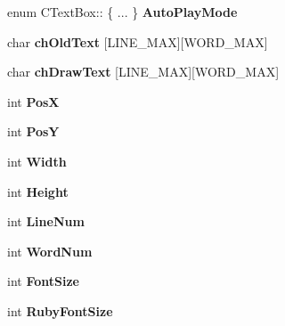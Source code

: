 \begin{DoxyCompactItemize}
\item 
enum C\+Text\+Box\+:: \{ ... \}  {\bfseries Auto\+Play\+Mode}\hypertarget{class_c_text_box_ad30a874114c3e2ca93441e9fb374b61c}{}\label{class_c_text_box_ad30a874114c3e2ca93441e9fb374b61c}

\item 
char {\bfseries ch\+Old\+Text} \mbox{[}L\+I\+N\+E\+\_\+\+M\+AX\mbox{]}\mbox{[}W\+O\+R\+D\+\_\+\+M\+AX\mbox{]}\hypertarget{class_c_text_box_a0454ed50e5d79fefcdc1f91695f2de68}{}\label{class_c_text_box_a0454ed50e5d79fefcdc1f91695f2de68}

\item 
char {\bfseries ch\+Draw\+Text} \mbox{[}L\+I\+N\+E\+\_\+\+M\+AX\mbox{]}\mbox{[}W\+O\+R\+D\+\_\+\+M\+AX\mbox{]}\hypertarget{class_c_text_box_ab018e05077780da9e10d792d4a7ab611}{}\label{class_c_text_box_ab018e05077780da9e10d792d4a7ab611}

\item 
int {\bfseries PosX}\hypertarget{class_c_text_box_a8dcd0af6f70eb5aa8acb77e566031a81}{}\label{class_c_text_box_a8dcd0af6f70eb5aa8acb77e566031a81}

\item 
int {\bfseries PosY}\hypertarget{class_c_text_box_a6889565bd4cb7aa0d89d8883e5f0c320}{}\label{class_c_text_box_a6889565bd4cb7aa0d89d8883e5f0c320}

\item 
int {\bfseries Width}\hypertarget{class_c_text_box_a5efbf7d41c39492fe8db1522d27f426b}{}\label{class_c_text_box_a5efbf7d41c39492fe8db1522d27f426b}

\item 
int {\bfseries Height}\hypertarget{class_c_text_box_a93136077935aeb3f63fc65ced6474d1a}{}\label{class_c_text_box_a93136077935aeb3f63fc65ced6474d1a}

\item 
int {\bfseries Line\+Num}\hypertarget{class_c_text_box_a9556805b6b8b168811701237c1af1d35}{}\label{class_c_text_box_a9556805b6b8b168811701237c1af1d35}

\item 
int {\bfseries Word\+Num}\hypertarget{class_c_text_box_a46cf099d25cac4d9425ac0fea8a298ad}{}\label{class_c_text_box_a46cf099d25cac4d9425ac0fea8a298ad}

\item 
int {\bfseries Font\+Size}\hypertarget{class_c_text_box_afc2123363432553fb08d58dd889cc375}{}\label{class_c_text_box_afc2123363432553fb08d58dd889cc375}

\item 
int {\bfseries Ruby\+Font\+Size}\hypertarget{class_c_text_box_a733cdec9c6a620d9e2b4af1c5cceaa07}{}\label{class_c_text_box_a733cdec9c6a620d9e2b4af1c5cceaa07}


\end{DoxyCompactItemize}
